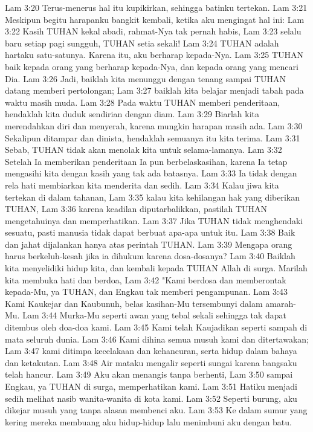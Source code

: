 Lam 3:20  Terus-menerus hal itu kupikirkan, sehingga batinku tertekan.
Lam 3:21  Meskipun begitu harapanku bangkit kembali, ketika aku mengingat hal ini:
Lam 3:22  Kasih TUHAN kekal abadi, rahmat-Nya tak pernah habis,
Lam 3:23  selalu baru setiap pagi sungguh, TUHAN setia sekali!
Lam 3:24  TUHAN adalah hartaku satu-satunya. Karena itu, aku berharap kepada-Nya.
Lam 3:25  TUHAN baik kepada orang yang berharap kepada-Nya, dan kepada orang yang mencari Dia.
Lam 3:26  Jadi, baiklah kita menunggu dengan tenang sampai TUHAN datang memberi pertolongan;
Lam 3:27  baiklah kita belajar menjadi tabah pada waktu masih muda.
Lam 3:28  Pada waktu TUHAN memberi penderitaan, hendaklah kita duduk sendirian dengan diam.
Lam 3:29  Biarlah kita merendahkan diri dan menyerah, karena mungkin harapan masih ada.
Lam 3:30  Sekalipun ditampar dan dinista, hendaklah semuanya itu kita terima.
Lam 3:31  Sebab, TUHAN tidak akan menolak kita untuk selama-lamanya.
Lam 3:32  Setelah Ia memberikan penderitaan Ia pun berbelaskasihan, karena Ia tetap mengasihi kita dengan kasih yang tak ada batasnya.
Lam 3:33  Ia tidak dengan rela hati membiarkan kita menderita dan sedih.
Lam 3:34  Kalau jiwa kita tertekan di dalam tahanan,
Lam 3:35  kalau kita kehilangan hak yang diberikan TUHAN,
Lam 3:36  karena keadilan diputarbalikkan, pastilah TUHAN mengetahuinya dan memperhatikan.
Lam 3:37  Jika TUHAN tidak menghendaki sesuatu, pasti manusia tidak dapat berbuat apa-apa untuk itu.
Lam 3:38  Baik dan jahat dijalankan hanya atas perintah TUHAN.
Lam 3:39  Mengapa orang harus berkeluh-kesah jika ia dihukum karena dosa-dosanya?
Lam 3:40  Baiklah kita menyelidiki hidup kita, dan kembali kepada TUHAN Allah di surga. Marilah kita membuka hati dan berdoa,
Lam 3:42  "Kami berdosa dan memberontak kepada-Mu, ya TUHAN, dan Engkau tak memberi pengampunan.
Lam 3:43  Kami Kaukejar dan Kaubunuh, belas kasihan-Mu tersembunyi dalam amarah-Mu.
Lam 3:44  Murka-Mu seperti awan yang tebal sekali sehingga tak dapat ditembus oleh doa-doa kami.
Lam 3:45  Kami telah Kaujadikan seperti sampah di mata seluruh dunia.
Lam 3:46  Kami dihina semua musuh kami dan ditertawakan;
Lam 3:47  kami ditimpa kecelakaan dan kehancuran, serta hidup dalam bahaya dan ketakutan.
Lam 3:48  Air mataku mengalir seperti sungai karena bangsaku telah hancur.
Lam 3:49  Aku akan menangis tanpa berhenti,
Lam 3:50  sampai Engkau, ya TUHAN di surga, memperhatikan kami.
Lam 3:51  Hatiku menjadi sedih melihat nasib wanita-wanita di kota kami.
Lam 3:52  Seperti burung, aku dikejar musuh yang tanpa alasan membenci aku.
Lam 3:53  Ke dalam sumur yang kering mereka membuang aku hidup-hidup lalu menimbuni aku dengan batu.
